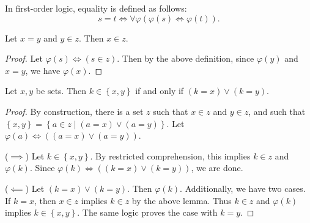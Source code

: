 \begin{definition}[Equality]\label{dfn:equality}
	In first-order logic, equality is defined as follows:
	\[
		s=t \iff \forall \varphi (\varphi (s) \iff \varphi (t))
	.\]
\end{definition}

\begin{lemma}\label{lma:owo2}
	Let $x=y$ and $y\in z$. Then $x\in z$.
\end{lemma}
\begin{proof}
	Let $\varphi (s) \iff (s\in z)$. Then by the above definition, since $\varphi (y)$ and $x=y$, we have $\varphi (x)$.
\end{proof}

\begin{lemma}\label{lma:owo}
	Let $x,y$ be sets. Then $k\in \left\{ x,y \right\} $ if and only if $(k=x)\lor (k=y)$.
\end{lemma}
\begin{proof}
	By construction, there is a set $z$ such that $x\in z$ and $y\in z$, and such that $\left\{ x,y \right\} =\left\{ a\in z \mid (a=x)\lor (a=y) \right\} $. Let $\varphi (a) \iff ( (a=x)\lor (a=y))$.

	($\implies $) Let $k\in \left\{ x,y \right\} $. By restricted comprehension, this implies $k\in z$ and $\varphi (k)$. Since $\varphi (k) \iff ((k=x)\lor (k=y))$, we are done.
	
	($\impliedby $) Let $(k=x)\lor (k=y)$. Then $\varphi (k)$. Additionally, we have two cases. If $k=x$, then $x\in z$ implies $k\in z$ by the above lemma. Thus $k\in z$ and $\varphi (k)$ implies $k\in \left\{ x,y \right\} $. The same logic proves the case with $k=y$.
\end{proof}



